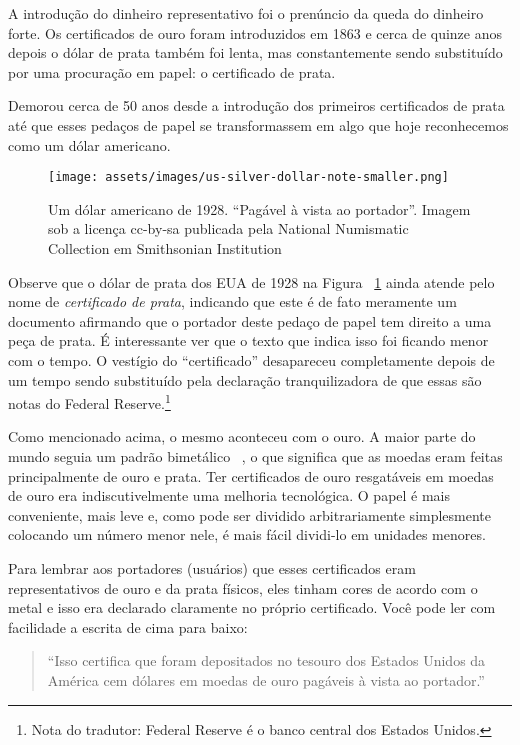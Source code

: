 A introdução do dinheiro representativo foi o prenúncio da queda do dinheiro forte. Os certificados de ouro foram introduzidos em 1863 e cerca de quinze anos depois o dólar de prata também foi lenta, mas constantemente sendo substituído por uma procuração em papel: o certificado de prata. \cite{wiki:silver-certificate}

Demorou cerca de 50 anos desde a introdução dos primeiros certificados de prata até que esses pedaços de papel se transformassem em algo que hoje reconhecemos como um dólar americano.

\begin{figure}
  \centering
  \texttt{[image: assets/images/us-silver-dollar-note-smaller.png]}
  \caption{Um dólar americano de 1928. \enquote{Pagável à vista ao portador}. Imagem sob a licença cc-by-sa publicada pela National Numismatic Collection em Smithsonian Institution}
  \label{fig:us-silver-dollar-note-smaller}
\end{figure}

Observe que o dólar de prata dos EUA de 1928 na Figura ~\ref{fig:us-silver-dollar-note-smaller} ainda atende pelo nome de \textit{certificado de prata}, indicando que este é de fato meramente um documento afirmando que o portador deste pedaço de papel tem direito a uma peça de prata. É interessante ver que o texto que indica isso foi ficando menor com o tempo. O vestígio do \enquote{certificado} desapareceu completamente depois de um tempo sendo substituído pela declaração tranquilizadora de que essas são notas do Federal Reserve.\footnote{Nota do tradutor: Federal Reserve é o banco central dos Estados Unidos.}

Como mencionado acima, o mesmo aconteceu com o ouro. A maior parte do mundo seguia um padrão bimetálico ~\cite {wiki:bimetallism}, o que significa que as moedas eram feitas principalmente de ouro e prata. Ter certificados de ouro resgatáveis em moedas de ouro era indiscutivelmente uma melhoria tecnológica. O papel é mais conveniente, mais leve e, como pode ser dividido arbitrariamente simplesmente colocando um número menor nele, é mais fácil dividi-lo em unidades menores.

Para lembrar aos portadores (usuários) que esses certificados eram representativos de ouro e da prata físicos, eles tinham cores de acordo com o metal e isso era declarado claramente no próprio certificado. Você pode ler com facilidade a escrita de cima para baixo:

\begin{quotation}\begin{samepage}
\enquote{Isso certifica que foram depositados no tesouro dos Estados Unidos da América cem dólares em moedas de ouro pagáveis à vista ao portador.}
\end{samepage}\end{quotation}

